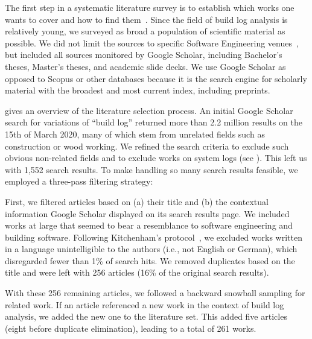 The first step in a systematic literature survey is to
establish which works one wants to cover and how to find
them~\cite{kitchenham2009systematic}.
Since the field of build log analysis is relatively young, we
surveyed as broad a population of scientific material as possible.
We did not limit the sources to specific Software Engineering
venues~\cite{petersen2015guidelines}, but included all sources
monitored by Google Scholar, including Bachelor's theses, Master's
theses, and academic slide decks.
We use Google Scholar as opposed to Scopus or
other databases because it is the search engine for scholarly material
with
the broadest and most current index, including preprints.

 gives an overview of the literature selection
process.
An initial Google Scholar search for variations of ``build log''
returned more than 2.2 million results on the 15th of March 2020, many
of which stem
from unrelated fields such as construction or wood working.
We refined the search criteria to exclude such obvious
non-related fields and to exclude works on system
logs (see ).
This left us with 1,552 search results.
To make handling so many search results feasible, we employed a
three-pass filtering strategy:

First, we filtered articles based on (a) their title and (b) the
contextual information Google Scholar displayed on its search results
page.
We included works at large that seemed to bear a resemblance to software
engineering and building software.
Following Kitchenham's protocol~\cite{kitchenham2009systematic},
we excluded
works written in a language unintelligible to the authors
(i.e., not English or German), which disregarded fewer than 1\% of search
hits.
We removed duplicates based on the title and were
left with 256 articles (16\% of the original search results).

With these 256 remaining articles, we followed a backward snowball
sampling for related work.
If an article referenced a new work in the context
of build log analysis, we added the new one to the literature set.
This added five articles (eight before
duplicate elimination), leading to a total of 261
works.

